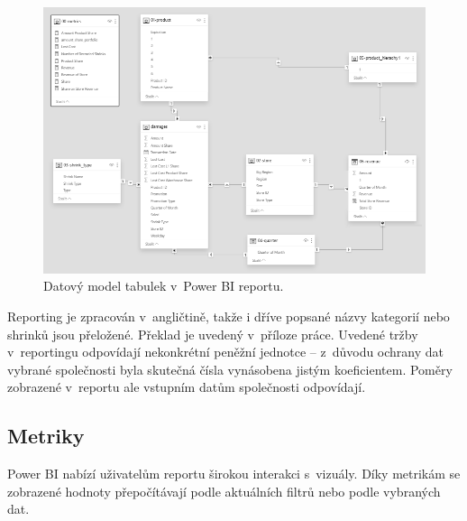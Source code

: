 \begin{figure}[h!]
    \centering
    \captionsetup{justification=centering}
    \includegraphics[width=\textwidth]{obrazky/PBI/datmodel.png}
    \caption{Datový model tabulek v~Power BI reportu.}
    \label{obr:datmod}
\end{figure}

Reporting je zpracován v~angličtině, takže i dříve popsané názvy kategorií nebo shrinků jsou přeložené. Překlad je uvedený v~příloze práce. Uvedené tržby v~reportingu odpovídají nekonkrétní peněžní jednotce -- z~důvodu ochrany dat vybrané společnosti byla skutečná čísla vynásobena jistým koeficientem. Poměry zobrazené v~reportu ale vstupním datům společnosti odpovídají.

\subsection{Metriky}

Power BI nabízí uživatelům reportu širokou interakci s~vizuály. Díky metrikám se zobrazené hodnoty přepočítávají podle aktuálních filtrů nebo podle vybraných dat. 

